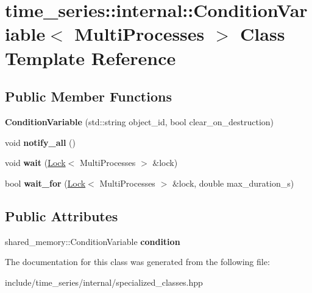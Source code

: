 \hypertarget{classtime__series_1_1internal_1_1ConditionVariable_3_01MultiProcesses_01_4}{}\section{time\+\_\+series\+:\+:internal\+:\+:Condition\+Variable$<$ Multi\+Processes $>$ Class Template Reference}
\label{classtime__series_1_1internal_1_1ConditionVariable_3_01MultiProcesses_01_4}
\subsection*{Public Member Functions}
\begin{DoxyCompactItemize}
\item 
\mbox{\label{classtime__series_1_1internal_1_1ConditionVariable_3_01MultiProcesses_01_4_aa10f91dd8c06860ea4f0ce68cb6b79a3}} 
{\bfseries Condition\+Variable} (std\+::string object\+\_\+id, bool clear\+\_\+on\+\_\+destruction)
\item 
\mbox{\label{classtime__series_1_1internal_1_1ConditionVariable_3_01MultiProcesses_01_4_a20d252072246eda6342c31c9e2cd64ff}} 
void {\bfseries notify\+\_\+all} ()
\item 
\mbox{\label{classtime__series_1_1internal_1_1ConditionVariable_3_01MultiProcesses_01_4_a0cf6775e3a5c53abc17cfd69ed303d75}} 
void {\bfseries wait} (\hyperlink{classtime__series_1_1internal_1_1Lock}{Lock}$<$ Multi\+Processes $>$ \&lock)
\item 
\mbox{\label{classtime__series_1_1internal_1_1ConditionVariable_3_01MultiProcesses_01_4_a3edc647b93bf392aa0bdbec1c2a94762}} 
bool {\bfseries wait\+\_\+for} (\hyperlink{classtime__series_1_1internal_1_1Lock}{Lock}$<$ Multi\+Processes $>$ \&lock, double max\+\_\+duration\+\_\+s)
\end{DoxyCompactItemize}
\subsection*{Public Attributes}
\begin{DoxyCompactItemize}
\item 
\mbox{\label{classtime__series_1_1internal_1_1ConditionVariable_3_01MultiProcesses_01_4_a06e19d063f59918dd503743aa3dc0d32}} 
shared\+\_\+memory\+::\+Condition\+Variable {\bfseries condition}
\end{DoxyCompactItemize}


The documentation for this class was generated from the following file\+:\begin{DoxyCompactItemize}
\item 
include/time\+\_\+series/internal/specialized\+\_\+classes.\+hpp\end{DoxyCompactItemize}
